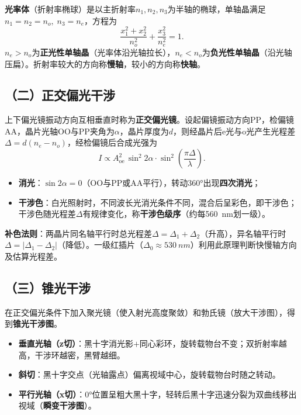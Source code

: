 \documentclass[a4paper,8pt,twocolumn]{article}
\begin{document}
\textbf{光率体}（折射率椭球）是以主折射率$n_1,n_2,n_3$为半轴的椭球，单轴晶满足$n_1=n_2=n_o,\;n_3=n_e$，方程为
\begin{equation}
  \frac{x_1^2+x_2^2}{n_o^2}+\frac{x_3^2}{n_e^2}=1.
  \tag{4-1-3}
\end{equation}
$n_e>n_o$为\textbf{正光性单轴晶}（光率体沿光轴拉长），$n_e<n_o$为\textbf{负光性单轴晶}（沿光轴压扁）。折射率较大的方向称\textbf{慢轴}，较小的方向称\textbf{快轴}。

\subsection*{（二）正交偏光干涉}

上下偏光镜振动方向互相垂直时称为\textbf{正交偏光镜}。设起偏镜振动方向PP，检偏镜AA，晶片光轴OO与PP夹角为$\alpha$，晶片厚度为$d$，则经晶片后e光与o光产生光程差$\Delta=d(n_e-n_o)$，经检偏镜后合成光强为
\begin{equation}
  I \propto A_{\mathrm{oe}}^2\,\sin^2\!2\alpha
  \cdot\sin^2\!\!\left(\frac{\pi\Delta}{\lambda}\right).
  \tag{4-1-6}
\end{equation}

\begin{itemize}
  \item \textbf{消光}：$\sin2\alpha=0$（OO与PP或AA平行），转动360°出现\textbf{四次消光}；
  \item \textbf{干涉色}：白光照射时，不同波长光消光条件不同，混合后呈彩色，即干涉色；干涉色随光程差$\Delta$有规律变化，称\textbf{干涉色级序}（约每\SI{560}{nm}划一级）。
\end{itemize}

\textbf{补色法则}：两晶片同名轴平行时总光程差$\Delta=\Delta_1+\Delta_2$（升高），异名轴平行时$\Delta=|\Delta_1-\Delta_2|$（降低）。一级红插片（$\Delta_0\approx\SI{530}{nm}$）利用此原理判断快慢轴方向及估算光程差。

\subsection*{（三）锥光干涉}

在正交偏光条件下加入聚光镜（使入射光高度聚敛）和勃氏镜（放大干涉图），得到\textbf{锥光干涉图}。

\begin{itemize}
  \item \textbf{垂直光轴（z切）}：黑十字消光影$+$同心彩环，旋转载物台不变；双折射率越高，干涉环越密，黑臂越细。
  \item \textbf{斜切}：黑十字交点（光轴露点）偏离视域中心，旋转载物台时随之转动。
  \item \textbf{平行光轴（x切）}：0°位置呈粗大黑十字，轻转后黑十字迅速分裂为双曲线移出视域（\textbf{瞬变干涉图}）。
\end{itemize}
\end{document}
